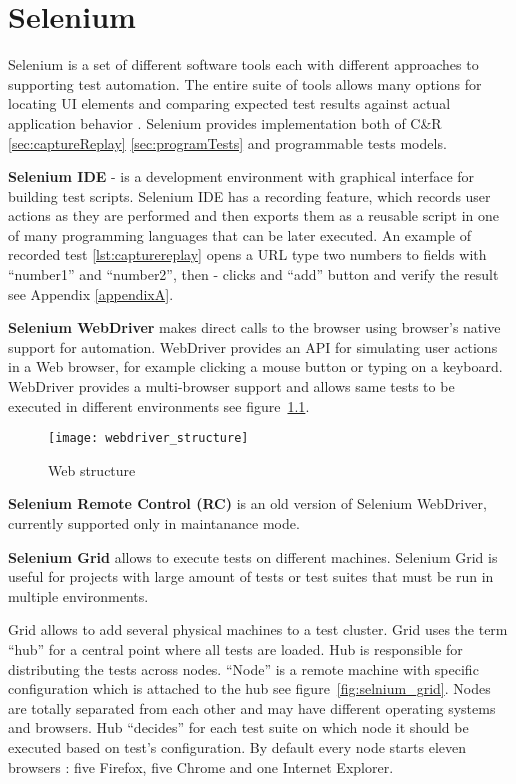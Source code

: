 	\chapter {Selenium}
	\label{ch:selenium}
      Selenium is a set of different software tools each with different
      approaches to supporting test automation. The entire suite of tools allows
      many options for locating UI elements and comparing expected test results
       against actual application behavior \cite{seleniumSite}.
       Selenium provides implementation both of C\&R \ref{sec:captureReplay}
       \ref{sec:programTests} and programmable tests models.  
       
       \textbf{Selenium IDE} - is a development environment with graphical
       interface for building test scripts.
		Selenium IDE has a recording feature,  which records user actions as they are
		performed and then exports them as a reusable script in one of many programming languages that can be later executed.
		An example of recorded test \ref{lst:capturereplay} opens a URL type two
		numbers to fields with ``number1'' and ``number2'', then -
		clicks and ``add'' button and verify the result see Appendix \ref{appendixA}.
		
       \textbf{Selenium  WebDriver} makes direct calls to the browser using
       browser's native support for automation. WebDriver provides an
       API for simulating user actions in a Web browser, for example
       clicking a mouse button or typing on a keyboard.
       WebDriver provides a multi-browser support and allows same tests to be executed in different
       environments see figure~\ref{fig:webdriver}.
       
	  \begin{figure}
	  \centering
  		\texttt{[image: webdriver\_structure]}
  		\caption{Web structure}
  		\label{fig:webdriver}
		\end{figure}
		
    	\textbf{Selenium Remote Control (RC)} is an old version of Selenium
    	WebDriver, currently supported only in maintanance mode.
       
       \textbf{Selenium Grid} allows to execute tests on different machines.
       Selenium Grid is useful for projects with large amount of tests or test
       suites that must be run in multiple environments.
       
		Grid allows to add several physical machines to a test cluster. Grid uses the
		term ``hub'' for a central point where all tests are loaded. Hub is responsible
		for distributing the tests across nodes. ``Node'' is  a remote machine with
		specific configuration which is attached to the hub see
		figure~\ref{fig:selnium_grid}. Nodes are totally separated from each other and
		may have different operating systems and browsers. Hub ``decides''
		for each test suite on which node it should be executed based on test's configuration.
		By default every node starts eleven browsers : five Firefox, five Chrome and
		one Internet Explorer.
		
